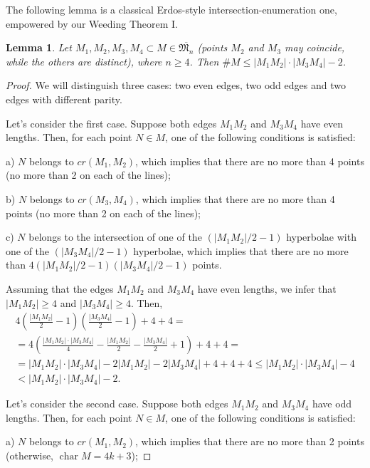 \documentclass[a4paper,14pt]{article} %
\theoremstyle{plain}
\newtheorem{lemma}[theorem]{Lemma}
\theoremstyle{definition}
\begin{document}
The following lemma is a classical Erdos-style intersection-enumeration one,
empowered by our Weeding Theorem I.

\begin{lemma}
	\label{lem:intersection_enumeration}
	Let ${M_1, M_2, M_3, M_4} \subset M \in \overline{\mathfrak{M}_n}$ (points $M_2$ and $M_3$ may coincide, while the others are distinct), where $n \ge 4$. Then $\# M \le |M_1 M_2| \cdot |M_3 M_4| - 2$.
\end{lemma}

\begin{proof}
	We will distinguish three cases: two even edges, two odd edges and two edges with different parity.


	Let's consider the first case. Suppose both edges $M_1M_2$ and $M_3M_4$ have even lengths. Then, for each point $N\in M$, one of the following conditions is satisfied:

	a) $N$ belongs to $cr(M_1,M_2)$, which implies that there are no more than 4 points (no more than 2 on each of the lines);

	b) $N$ belongs to $cr(M_3,M_4)$, which implies that there are no more than 4 points (no more than 2 on each of the lines);

	c) $N$ belongs to the intersection of one of the $(|M_1M_2|/2 - 1)$ hyperbolae with one of the $(|M_3M_4|/2 - 1)$ hyperbolae, which implies that there are no more than $4(|M_1M_2|/2 - 1)(|M_3M_4|/2 - 1)$ points.

	Assuming that the edges $M_1M_2$ and $M_3M_4$ have even lengths,
	we infer that $|M_1M_2|\geq4$ and $|M_3M_4|\geq4$.
	Then,
	\begin{multline}
		4 \left(\frac{|M_1 M_2|}{2} - 1\right) \left(\frac{|M_3 M_4|}{2} - 1 \right) + 4 + 4
		=
		\\=
		 4\left(\frac{|M_1 M_2| \cdot |M_3 M_4|}{4} - \frac{|M_1 M_2|}{2} - \frac{|M_3 M_4|}{2}+1\right) + 4 + 4
		=
		\\=
		|M_1 M_2| \cdot |M_3 M_4| - 2 |M_1 M_2| - 2 |M_3 M_4| + 4 + 4 + 4
		\leq
		|M_1 M_2| \cdot |M_3 M_4| - 4 \\
		<
		|M_1 M_2| \cdot |M_3 M_4| - 2
		.
	\end{multline}

	Let's consider the second case. Suppose both edges $M_1M_2$ and $M_3M_4$ have odd lengths. Then, for each point $N\in M$, one of the following conditions is satisfied:

	a) $N$ belongs to $cr(M_1,M_2)$, which implies that there are no more than 2 points (otherwise, $\operatorname{char} M = 4k+3$);


\end{proof}
\end{document}
